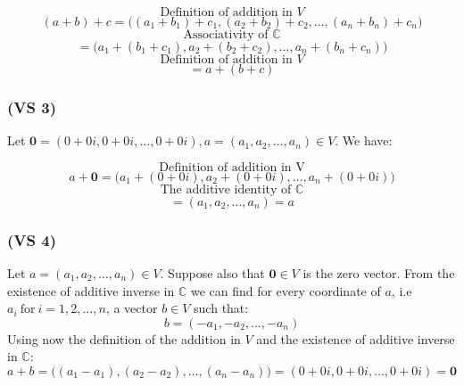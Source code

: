 \documentclass{article}
\begin{document}
\begin{equation*}
    \text{Definition of addition in \(V\)}
\end{equation*}
\begin{equation*}
    (a + b) + c = \Big((a_{1} + b_{1}) + c_{1}, (a_{2} + b_{2}) + c_{2}, \dots, (a_{n} + b_{n}) + c_{n}\Big)  
\end{equation*}
\begin{equation*}
    \text{Associativity of \(\mathbb{C}\)}
\end{equation*}
\begin{equation*}
    = \Big(a_{1} + (b_{1} + c_{1}), a_{2} + (b_{2} + c_{2}), \dots, a_{n} + (b_{n} + c_{n})\Big)
\end{equation*}
\begin{equation*}
    \text{Definition of addition in \(V\)}
\end{equation*}
\begin{equation*}
    = a + (b + c)
\end{equation*}

\subsubsection*{(VS 3)}

Let \(\boldsymbol{0} = (0 + 0i, 0 + 0i, \dots, 0 + 0i), a = (a_{1}, a_{2}, \dots, a_{n}) \in V\).
We have:

\begin{equation*}
    \text{Definition of addition in V}
\end{equation*}
\begin{equation*}
    a + \boldsymbol{0} = \Big(a_{1} + (0 + 0i), a_{2} + (0 + 0i), \dots, a_{n} + (0 + 0i)\Big)
\end{equation*}
\begin{equation*}
    \text{The additive identity of \(\mathbb{C}\)}
\end{equation*}
\begin{equation*}
    = (a_{1}, a_{2}, \dots, a_{n}) = a
\end{equation*}

\subsubsection*{(VS 4)}

Let \(a = (a_{1}, a_{2}, \dots, a_{n}) \in V\). Suppose also that \(\boldsymbol{0} \in V\) is the zero vector.
From the existence of additive inverse in \(\mathbb{C}\) we can find
for every coordinate of \(a\), i.e \(a_{i} \ \text{for} \  i=1,2,\dots, n\), a vector \(b \in V\) such that:
\begin{equation*}
    b = (-a_{1}, -a_{2}, \dots, -a_{n})
\end{equation*}
Using now the definition of the addition in \(V\) and the existence of additive inverse in \(\mathbb{C}\):
\begin{equation*}
    a + b = \Big((a_{1} - a_{1}), (a_{2} - a_{2}), \dots, (a_{n} - a_{n})\Big) = (0 + 0i, 0 + 0i, \dots, 0 + 0i) = \boldsymbol{0}
\end{equation*}
\end{document}
